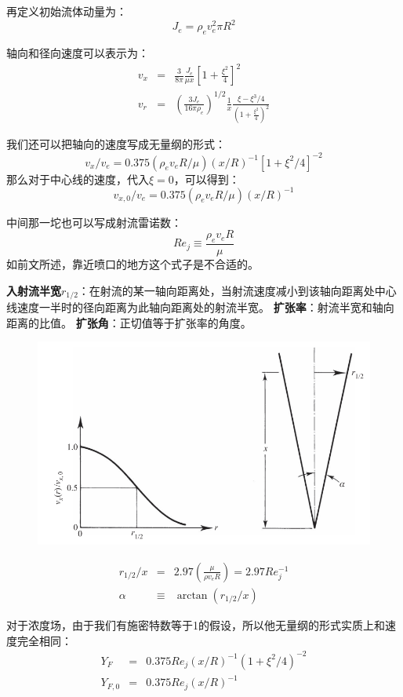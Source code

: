 再定义初始流体动量为：
\begin{equation}
    J_e = \rho_e v_e^2\pi R^2
\end{equation}

轴向和径向速度可以表示为：
\begin{eqnarray}
    v_x &=&\frac{3}{8\pi}\frac{J_e}{\mu x}\left[1+\frac{\xi^2}{4}\right]^2\\
    v_r &=& \left(\frac{3 J_e}{16\pi\rho_e}\right)^{1/2}\frac{1}{x}\frac{\xi-\xi^3/4}{\left(1+\frac{\xi^2}{4}\right)^2}
\end{eqnarray}

我们还可以把轴向的速度写成无量纲的形式：
\begin{equation}
    v_x/v_e = 0.375(\rho_e v_e R/\mu)(x/R)^{-1}[1+\xi^2/4]^{-2}
\end{equation}
那么对于中心线的速度，代入\(\xi=0\)，可以得到：
\begin{equation}
    v_{x,0}/v_e = 0.375(\rho_e v_e R/\mu)(x/R)^{-1}
\end{equation}

中间那一坨也可以写成射流雷诺数：
\begin{equation}
    Re_j \equiv \frac{\rho_e v_e R}{\mu}
\end{equation}
如前文所述，靠近喷口的地方这个式子是不合适的。

\textbf{入射流半宽}\(r_{1/2}\)：在射流的某一轴向距离处，当射流速度减小到该轴向距离处中心线速度一半时的径向距离为此轴向距离处的射流半宽。
\textbf{扩张率}：射流半宽和轴向距离的比值。
\textbf{扩张角}：正切值等于扩张率的角度。
\begin{figure}[H]
    \centering
    \includegraphics[width=.3\textwidth]{img/spreading_laminar.png}
\end{figure}

\begin{eqnarray}
    r_{1/2}/x &=& 2.97\left(\frac{\mu}{\rho v_e R}\right)=2.97 Re_j^{-1}\\
    \alpha &\equiv& \arctan(r_{1/2}/x)
\end{eqnarray}

对于浓度场，由于我们有施密特数等于1的假设，所以他无量纲的形式实质上和速度完全相同：
\begin{eqnarray}
    Y_F &=& 0.375 Re_j(x/R)^{-1}(1+\xi^2/4)^{-2}\\
    Y_{F,0} &=& 0.375 Re_j(x/R)^{-1}
\end{eqnarray}

